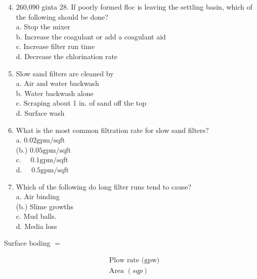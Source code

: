 \documentclass[10pt]{article}
\begin{document}
\begin{enumerate}
  \setcounter{enumi}{3}
  \item 260,090 ginta 28. If poorly formed floc is leaving the settling basin, which of the following should be done?\\
a. Stop the mixer\\
b. Increase the coagulant or add a coagulant aid\\
c. Increase filter run time\\
d. Decrease the chlorination rate

  \item Slow sand filters are cleaned by\\
a. Air and water backwash\\
b. Water backwash alone\\
c. Scraping about 1 in. of sand off the top\\
d. Surface wash

  \item What is the most common filtration rate for slow sand filters?\\
a. $0.02 \mathrm{gpm} / \mathrm{sq} \mathrm{ft}$\\
(b.) $0.05 \mathrm{gpm} / \mathrm{sq} \mathrm{ft}$\\
c. $\quad 0.1 \mathrm{gpm} / \mathrm{sq} \mathrm{ft}$\\
d. $\quad 0.5 \mathrm{gpm} / \mathrm{sq} \mathrm{ft}$

  \item Which of the following do long filter runs tend to cause?\\
a. Air binding\\
(b.) Slime growths\\
c. Mud balls.\\
d. Media loss

\end{enumerate}

Surface boding $=$

$$
\begin{aligned}
&\text { Plow rate (gpw) } \\
&\text { Area }(s q p)
\end{aligned}
$$
\end{document}
